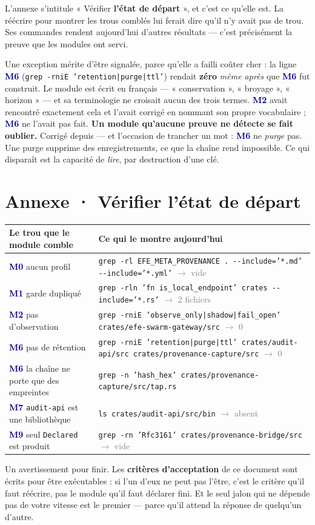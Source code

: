 \documentclass[10pt]{article}
\newcommand{\sz}[1]{\textcolor{grey}{\small\textsf{#1}}}
\newcommand{\code}[1]{\texttt{\small #1}}
\newcommand{\fl}{$\rightarrow$}
\newcommand{\mm}[1]{\textbf{\textcolor{navy}{#1}}}
\begin{document}
L'annexe s'intitule « Vérifier \textbf{l'état de départ} », et c'est ce qu'elle est. La réécrire pour
montrer les trous comblés lui ferait dire qu'il n'y avait pas de trou. Ses commandes rendent
aujourd'hui d'autres résultats --- c'est précisément la preuve que les modules ont servi.

Une exception mérite d'être signalée, parce qu'elle a failli coûter cher : la ligne \mm{M6}
(\code{grep -rniE 'retention|purge|ttl'}) rendait \textbf{zéro} \emph{même après} que \mm{M6} fut
construit. Le module est écrit en français --- « conservation », « broyage », « horizon » --- et sa
terminologie ne croisait aucun des trois termes. \mm{M2} avait rencontré exactement cela et l'avait
corrigé en nommant son propre vocabulaire ; \mm{M6} ne l'avait pas fait. \textbf{Un module qu'aucune
preuve ne détecte se fait oublier.} Corrigé depuis --- et l'occasion de trancher un mot : \mm{M6} ne
\emph{purge} pas. Une purge supprime des enregistrements, ce que la chaîne rend impossible. Ce qui
disparaît est la capacité de \emph{lire}, par destruction d'une clé.

\section{Annexe · Vérifier l'état de départ}

\renewcommand{\arraystretch}{1.22}
\begin{center}\small
\begin{tabular}{@{}>{\raggedright\arraybackslash}p{5.0cm} >{\raggedright\arraybackslash}p{11.0cm}@{}}
\toprule
\textbf{Le trou que le module comble} & \textbf{Ce qui le montre aujourd'hui} \\
\midrule
\mm{M0} aucun profil & \code{grep -rl EFE\_META\_PROVENANCE . -{}-include='*.md' -{}-include='*.yml'} \sz{\fl{} vide} \\
\mm{M1} garde dupliqué & \code{grep -rln 'fn is\_local\_endpoint' crates -{}-include='*.rs'} \sz{\fl{} 2 fichiers} \\
\mm{M2} pas d'observation & \code{grep -rniE 'observe\_only|shadow|fail\_open' crates/efe-swarm-gateway/src} \sz{\fl{} 0} \\
\mm{M6} pas de rétention & \code{grep -rniE 'retention|purge|ttl' crates/audit-api/src crates/provenance-capture/src} \sz{\fl{} 0} \\
\mm{M6} la chaîne ne porte que des empreintes & \code{grep -n 'hash\_hex' crates/provenance-capture/src/tap.rs} \\
\mm{M7} \code{audit-api} est une bibliothèque & \code{ls crates/audit-api/src/bin} \sz{\fl{} absent} \\
\mm{M9} seul \code{Declared} est produit & \code{grep -rn 'Rfc3161' crates/provenance-bridge/src} \sz{\fl{} vide} \\
\bottomrule
\end{tabular}
\end{center}

Un avertissement pour finir. Les \textbf{critères d'acceptation} de ce document sont écrits pour être
exécutables : si l'un d'eux ne peut pas l'être, c'est le critère qu'il faut réécrire, pas le module
qu'il faut déclarer fini. Et le seul jalon qui ne dépende pas de votre vitesse est le premier ---
parce qu'il attend la réponse de quelqu'un d'autre.
\end{document}
